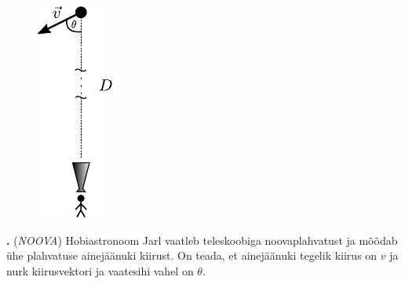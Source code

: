 \documentclass[11pt,a5paper]{article}
\newcommand{\numb}[1]{\vspace{5pt}\textbf{\large #1}}
\newcommand{\nimi}[1]{(\textsl{\small #1})}
\newcounter{ylesanne}
\newcommand{\yl}[1]{\addtocounter{ylesanne}{1}\numb{\theylesanne.} \nimi{#1} \newblock{}}
\begin{document}
	
	\begin{figure}
		\vspace{10pt}
		\includegraphics[width=1.1\linewidth]{noova_joon}
	\end{figure}
	\yl{NOOVA}
	Hobiastronoom Jarl vaatleb teleskoobiga noovaplahvatust ja mõõdab ühe plahvatuse ainejäänuki kiirust. On teada, et ainejäänuki tegelik kiirus on $v$ ja nurk kiirusvektori ja vaatesihi vahel on $\theta$.
	
\end{document}
